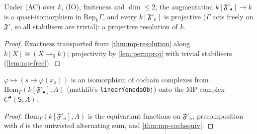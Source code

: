\begin{theorem}\label{thm:mp-projres}
  \leanok
  Under (AC) over $k$, (IO), finiteness and $\dim\le2$, the augmentation $k[\mathfrak F'_\bullet]\to k$ is a quasi-isomorphism in
  $\mathrm{Rep}_k\Gamma$, and every $k[\mathfrak F'_n]$ is projective ($\Gamma$ acts freely on $\mathfrak F'$, so all stabilisers are
  trivial): a projective resolution of $k$.
\end{theorem}
\begin{proof}
  \leanok
  Exactness transported from \ref{thm:mp-resolution} along $k[X]\cong(X\to_0k)$; projectivity by \ref{lem:permproj} with trivial
  stabilisers (\ref{lem:mp-free}).
\end{proof}

\begin{theorem}\label{thm:mp-homequiv}
  \leanok
  $\varphi\mapsto(s\mapsto\varphi(x_s))$ is an isomorphism of cochain complexes from $\mathrm{Hom}_\Gamma(k[\mathfrak F'_\bullet],A)$ (mathlib's
  \texttt{linearYonedaObj}) onto the MP complex $C^\bullet(\mathsf S;A)$.
\end{theorem}
\begin{proof}
  \leanok
  $\mathrm{Hom}_\Gamma(k[\mathfrak F'_n],A)$ is the equivariant functions on $\mathfrak F'_n$, precomposition with $d$ is the untwisted
  alternating sum, and \ref{thm:mp-cochequiv}.
\end{proof}

